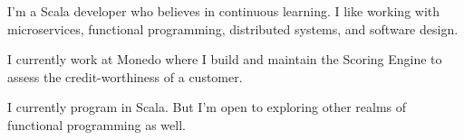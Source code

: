 

\begin{cvparagraph}

I'm a Scala developer who believes in continuous learning. I like working with microservices, functional programming, distributed systems, and software design.

I currently work at Monedo where I build and maintain the Scoring Engine to assess the credit-worthiness of a customer.
    
I currently program in Scala. But I'm open to exploring other realms of functional programming as well.
\end{cvparagraph}
